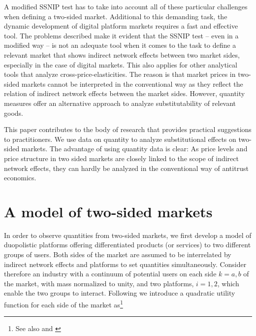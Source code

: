 \documentclass[12pt,a4paper,notitlepage]{article}
\begin{document}
A modified SSNIP test has to take into account all of these particular challenges when defining a two-sided market. Additional to this demanding task, the dynamic development of digital platform markets requires a fast and effective tool. The problems described make it evident that the SSNIP test – even in a modified way – is not an adequate tool when it comes to the task to define a relevant market that shows indirect network effects between two market sides, especially in the case of digital markets. This also applies for other analytical tools that analyze cross-price-elasticities. The reason is that market prices in two-sided markets cannot be interpreted in the conventional way as they reflect the relation of indirect network effects between the market sides. However, quantity measures offer an alternative approach to analyze substitutability of relevant goods. 

This paper contributes to the body of research that provides practical suggestions to practitioners. We use data on quantity to analyze substitutional effects on two-sided markets. The advantage of using quantity data is clear: As price levels and price structure in two sided markets are closely linked to the scope of indirect network effects, they can hardly be analyzed in the conventional way of antitrust economics. 









\section{A model of two-sided markets}\label{model}
In order to observe quantities from two-sided markets, we first develop a model of duopolistic platforms offering differentiated products (or services) to two different groups of users. Both sides of the market are assumed to be interrelated by indirect network effects and platforms to set quantities simultaneously. Consider therefore an industry with a continuum of potential users on each side $k = a,b$ of the market, with mass normalized to unity, and two platforms, $i = 1,2$, which enable the two groups to interact. Following \cite{shubik_market_1980} we introduce a quadratic utility function for each side of the market as\footnote{See also \cite{dixit_model_1979} and \cite{kind_competition_2006}}
\end{document}
